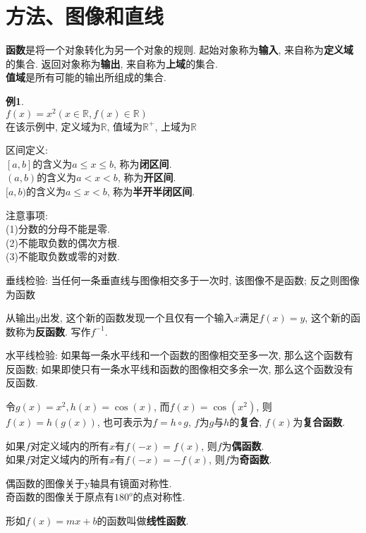 \chapter{方法、图像和直线}
\textbf{函数}是将一个对象转化为另一个对象的规则. 起始对象称为\textbf{输入}, 来自称为\textbf{定义域}的集合. 返回对象称为\textbf{输出}, 来自称为\textbf{上域}的集合.\\
\textbf{值域}是所有可能的输出所组成的集合.

\textbf{例1}.\\
$f(x)=x^2(x\in\mathbb{R}, f(x)\in\mathbb{R})$\\
在该示例中, 定义域为$\mathbb{R}$, 值域为$\mathbb{R}^+$, 上域为$\mathbb{R}$

区间定义:\\
$[a,b]$的含义为$a\leqslant x\leqslant b$, 称为\textbf{闭区间}.\\
$(a,b)$的含义为$a<x<b$, 称为\textbf{开区间}.\\
$[a,b)$的含义为$a\leqslant x<b$, 称为\textbf{半开半闭区间}.

注意事项:\\
(1)分数的分母不能是零.\\
(2)不能取负数的偶次方根.\\
(3)不能取负数或零的对数.

垂线检验: 当任何一条垂直线与图像相交多于一次时, 该图像不是函数; 反之则图像为函数

从输出$y$出发, 这个新的函数发现一个且仅有一个输入$x$满足$f(x)=y$, 这个新的函数称为\textbf{反函数}. 写作$f^{-1}$.

水平线检验: 如果每一条水平线和一个函数的图像相交至多一次, 那么这个函数有反函数; 如果即使只有一条水平线和函数的图像相交多余一次, 那么这个函数没有反函数.

令$g(x)=x^2, h(x)=\cos(x)$, 而$f(x)=\cos(x^2)$, 则$f(x)=h(g(x))$, 也可表示为$f=h\circ g$, $f$为$g$与$h$的\textbf{复合}, $f(x)$为\textbf{复合函数}.

如果$f$对定义域内的所有$x$有$f(-x)=f(x)$, 则$f$为\textbf{偶函数}.\\
如果$f$对定义域内的所有$x$有$f(-x)=-f(x)$, 则$f$为\textbf{奇函数}.

偶函数的图像关于y轴具有镜面对称性.\\
奇函数的图像关于原点有$180^o$的点对称性.

形如$f(x)=mx+b$的函数叫做\textbf{线性函数}.
